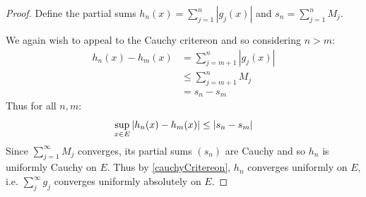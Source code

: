 \documentclass[../main.tex]{subfiles}
\begin{document}
\begin{proof}
  Define the partial sums $h_n(x) = \sum_{j = 1}^{n} |g_j(x)|$ and $s_n = \sum_{j = 1}^{n} M_j$.

  We again wish to appeal to the Cauchy critereon and so considering $n > m$:
  \begin{align*}
    h_n(x) - h_m(x) &= \sum_{j = m + 1}^{n} |g_j(x)| \\
                    &\leq \sum_{j = m + 1}^{n} M_j \\
                    &= s_n - s_m
  \end{align*}
  Thus for all $n, m$:
  \[
    \sup_{x \in E} \left\lvert h_n(x) - h_m(x) \right\rvert \leq |s_n - s_m|
  \]
  Since $\sum_{j = 1}^{\infty} M_j$ converges, its partial sums $(s_n)$ are Cauchy and so $h_n$ is uniformly Cauchy on $E$.
  Thus by \cref{cauchyCritereon}, $h_n$ converges uniformly on $E$, i.e. $\sum_{j }^{\infty} g_j$ converges uniformly absolutely on $E$.
\end{proof}
\end{document}
